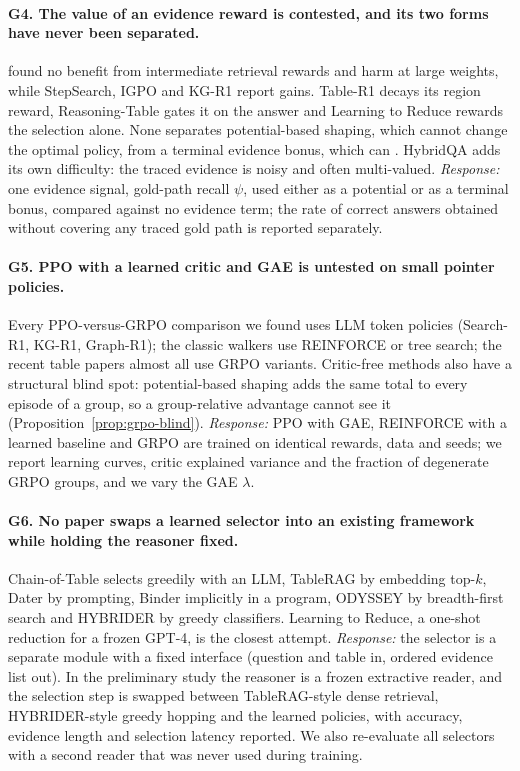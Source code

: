 \paragraph{G4. The value of an evidence reward is contested, and its two forms have never been separated.} \citet{jin2025empirical} found no benefit from intermediate retrieval rewards and harm at large weights, while StepSearch, IGPO and KG-R1 report gains. Table-R1 decays its region reward, Reasoning-Table gates it on the answer and Learning to Reduce rewards the selection alone. None separates potential-based shaping, which cannot change the optimal policy, from a terminal evidence bonus, which can \citep{ng1999policy}. HybridQA adds its own difficulty: the traced evidence is noisy and often multi-valued. \emph{Response:} one evidence signal, gold-path recall $\psi$, used either as a potential or as a terminal bonus, compared against no evidence term; the rate of correct answers obtained without covering any traced gold path is reported separately.

\paragraph{G5. PPO with a learned critic and GAE is untested on small pointer policies.} Every PPO-versus-GRPO comparison we found uses LLM token policies (Search-R1, KG-R1, Graph-R1); the classic walkers use REINFORCE or tree search; the recent table papers almost all use GRPO variants. Critic-free methods also have a structural blind spot: potential-based shaping adds the same total to every episode of a group, so a group-relative advantage cannot see it (Proposition~\ref{prop:grpo-blind}). \emph{Response:} PPO with GAE, REINFORCE with a learned baseline and GRPO are trained on identical rewards, data and seeds; we report learning curves, critic explained variance and the fraction of degenerate GRPO groups, and we vary the GAE $\lambda$.

\paragraph{G6. No paper swaps a learned selector into an existing framework while holding the reasoner fixed.} Chain-of-Table selects greedily with an LLM, TableRAG by embedding top-$k$, Dater by prompting, Binder implicitly in a program, ODYSSEY by breadth-first search and HYBRIDER by greedy classifiers. Learning to Reduce, a one-shot reduction for a frozen GPT-4, is the closest attempt. \emph{Response:} the selector is a separate module with a fixed interface (question and table in, ordered evidence list out). In the preliminary study the reasoner is a frozen extractive reader, and the selection step is swapped between TableRAG-style dense retrieval, HYBRIDER-style greedy hopping and the learned policies, with accuracy, evidence length and selection latency reported. We also re-evaluate all selectors with a second reader that was never used during training.


